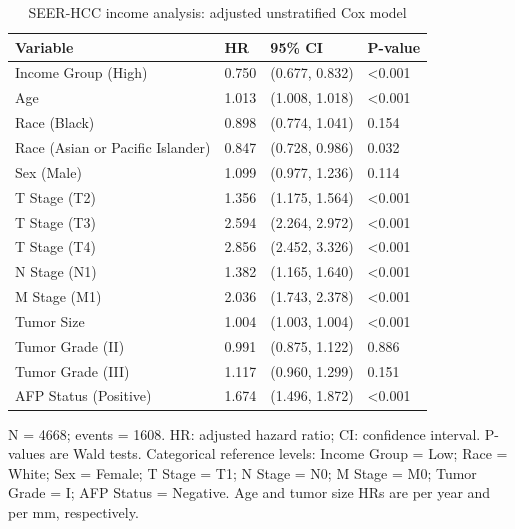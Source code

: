 \begin{table}[!htbp]
\centering
\small
\caption{SEER-HCC income analysis: adjusted unstratified Cox model}
\begin{tabular}{llll}
\toprule
Variable & HR & 95\% CI & P-value \\
\midrule
Income Group (High) & 0.750 & (0.677, 0.832) & \textless{}0.001 \\
Age & 1.013 & (1.008, 1.018) & \textless{}0.001 \\
Race (Black) & 0.898 & (0.774, 1.041) & 0.154 \\
Race (Asian or Pacific Islander) & 0.847 & (0.728, 0.986) & 0.032 \\
Sex (Male) & 1.099 & (0.977, 1.236) & 0.114 \\
T Stage (T2) & 1.356 & (1.175, 1.564) & \textless{}0.001 \\
T Stage (T3) & 2.594 & (2.264, 2.972) & \textless{}0.001 \\
T Stage (T4) & 2.856 & (2.452, 3.326) & \textless{}0.001 \\
N Stage (N1) & 1.382 & (1.165, 1.640) & \textless{}0.001 \\
M Stage (M1) & 2.036 & (1.743, 2.378) & \textless{}0.001 \\
Tumor Size & 1.004 & (1.003, 1.004) & \textless{}0.001 \\
Tumor Grade (II) & 0.991 & (0.875, 1.122) & 0.886 \\
Tumor Grade (III) & 1.117 & (0.960, 1.299) & 0.151 \\
AFP Status (Positive) & 1.674 & (1.496, 1.872) & \textless{}0.001 \\
\bottomrule
\end{tabular}
\begin{minipage}{0.95\linewidth}
\vspace{0.5em}
\footnotesize N = 4668; events = 1608. HR: adjusted hazard ratio; CI: confidence interval. P-values are Wald tests. Categorical reference levels: Income Group = Low; Race = White; Sex = Female; T Stage = T1; N Stage = N0; M Stage = M0; Tumor Grade = I; AFP Status = Negative. Age and tumor size HRs are per year and per mm, respectively.
\end{minipage}
\end{table}
